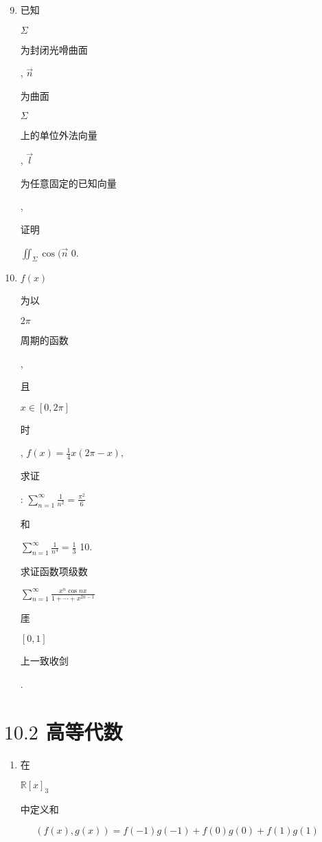 \documentclass[10pt]{article}
\begin{document}
\begin{enumerate}
  \setcounter{enumi}{8}
  \item \begin{CJK}{UTF8}{mj}已知\end{CJK} $\Sigma$ \begin{CJK}{UTF8}{mj}为封闭光嗗曲面\end{CJK}, $\vec{n}$ \begin{CJK}{UTF8}{mj}为曲面\end{CJK} $\Sigma$ \begin{CJK}{UTF8}{mj}上的单位外法向量\end{CJK}, $\vec{l}$ \begin{CJK}{UTF8}{mj}为任意固定的已知向量\end{CJK},\begin{CJK}{UTF8}{mj}证明\end{CJK} $\iint_{\Sigma} \cos (\vec{n}$ $0 .$

  \item $f(x)$ \begin{CJK}{UTF8}{mj}为以\end{CJK} $2 \pi$ \begin{CJK}{UTF8}{mj}周期的函数\end{CJK}, \begin{CJK}{UTF8}{mj}且\end{CJK} $x \in[0,2 \pi]$ \begin{CJK}{UTF8}{mj}时\end{CJK}, $f(x)=\frac{1}{4} x(2 \pi-x)$, \begin{CJK}{UTF8}{mj}求证\end{CJK}: $\sum_{n=1}^{\infty} \frac{1}{n^{2}}=\frac{\pi^{2}}{6}$ \begin{CJK}{UTF8}{mj}和\end{CJK} $\sum_{n=1}^{\infty} \frac{1}{n^{4}}=\frac{1}{3}$ 10. \begin{CJK}{UTF8}{mj}求证函数项级数\end{CJK} $\sum_{n=1}^{\infty} \frac{x^{n} \cos n x}{1+\cdots+x^{2 n-1}}$ \begin{CJK}{UTF8}{mj}厓\end{CJK} $[0,1]$ \begin{CJK}{UTF8}{mj}上一致收剑\end{CJK}.

\end{enumerate}
\section{$10.2$ 高等代数}
\begin{enumerate}
  \item \begin{CJK}{UTF8}{mj}在\end{CJK} $\mathbb{R}[x]_{3}$ \begin{CJK}{UTF8}{mj}中定义和\end{CJK}
\end{enumerate}
$$
(f(x), g(x))=f(-1) g(-1)+f(0) g(0)+f(1) g(1)
$$
\end{document}
